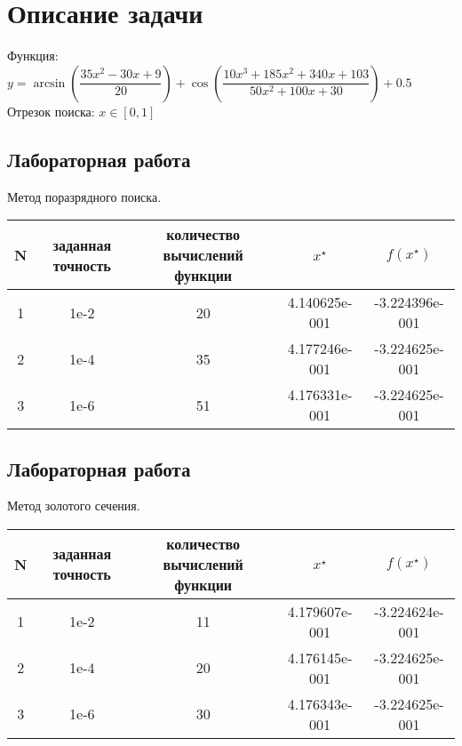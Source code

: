 \documentclass[a4paper,12pt]{article}
\begin{document}


\newpage
\section{Описание задачи}
 
Функция: $y = \arcsin \left(\dfrac{35x^2 - 30x + 9}{20}\right) + \cos \left( \dfrac{10x^3 + 185x^2 + 340x + 103}{50x^2 + 100x + 30}\right)+0.5$ \\
Отрезок поиска: $x \in [0, 1]$

\subsection{Лабораторная работа }
Метод поразрядного поиска.
\begin{table}[!ht]
  \begin{tabular}{|c|c|c|c|c|}
  \hline
  N & заданная точность & количество вычислений функции & $x^{\star}$ & $f(x^{\star})$ \\
  \hline
  1 & 1e-2 & 20 & 4.140625e-001 & -3.224396e-001 \\
  \hline
  2 & 1e-4 & 35 & 4.177246e-001 & -3.224625e-001 \\
  \hline
  3 & 1e-6 & 51 & 4.176331e-001 & -3.224625e-001 \\
  \hline
  \end{tabular}
\end{table}

\subsection{Лабораторная работа }
Метод золотого сечения.
\begin{table}[!ht]
  \begin{tabular}{|c|c|c|c|c|}
  \hline
  N & заданная точность & количество вычислений функции & $x^{\star}$ & $f(x^{\star})$ \\
  \hline
  1 & 1e-2 & 11 & 4.179607e-001 & -3.224624e-001 \\
  \hline
  2 & 1e-4 & 20 & 4.176145e-001 & -3.224625e-001 \\
  \hline
  3 & 1e-6 & 30 & 4.176343e-001 & -3.224625e-001 \\
  \hline
  \end{tabular}
\end{table}
\end{document}
